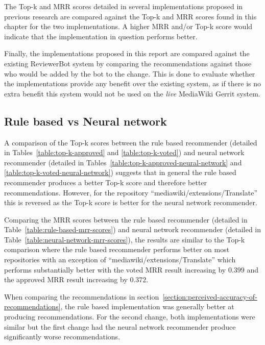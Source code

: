 The Top-k and MRR scores detailed in several implementations proposed in previous research are compared against the Top-k and MRR scores found in this chapter for the two implementations. A higher MRR and/or Top-k score would indicate that the implementation in question performs better.

Finally, the implementations proposed in this report are compared against the existing ReviewerBot system by comparing the recommendations against those who would be added by the bot to the change. This is done to evaluate whether the implementations provide any benefit over the existing system, as if there is no extra benefit this system would not be used on the \emph{live} MediaWiki Gerrit system.


\subsection{Rule based vs Neural network\label{section:rule-based-against-neural-network}}

A comparison of the Top-k scores between the rule based recommender (detailed in Tables~\ref{table:top-k-approved} and \ref{table:top-k-voted}) and neural network recommender (detailed in Tables~\ref{table:top-k-approved-neural-network} and \ref{table:top-k-voted-neural-network}) suggests that in general the rule based recommender produces a better Top-k score and therefore better recommendations. However, for the repository ``mediawiki/extensions/Translate'' this is reversed as the Top-k score is better for the neural network recommender.

Comparing the MRR scores between the rule based recommender (detailed in Table~\ref{table:rule-based-mrr-scores}) and neural network recommender (detailed in Table~\ref{table:neural-network-mrr-scores}), the results are similar to the Top-k comparison where the rule based recommender performs better on most repositories with an exception of ``mediawiki/extensions/Translate'' which performs substantially better with the voted MRR result increasing by \(0.399\) and the approved MRR result increasing by \(0.372\).

When comparing the recommendations in section~\ref{section:perceived-accuracy-of-recommendations}, the rule based implementation was generally better at producing recommendations. For the second change, both implementations were similar but the first change had the neural network recommender produce significantly worse recommendations.

